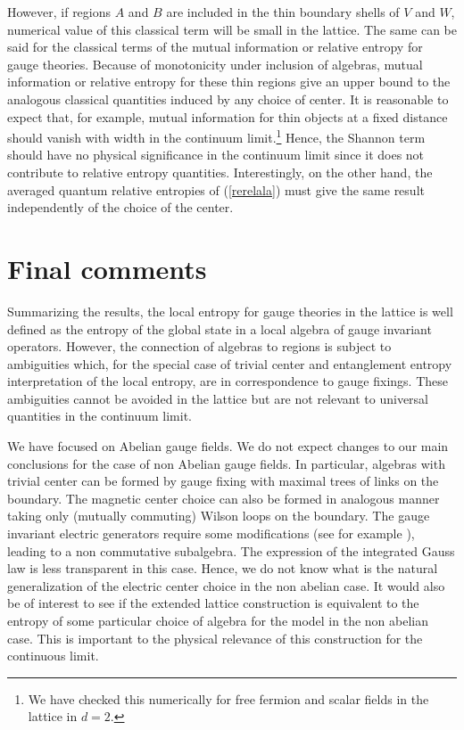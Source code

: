 \documentclass[12pt,a4paper]{article}
\begin{document}
However, if regions $A$ and $B$ are included in the thin boundary shells of $V$ and $W$, numerical value of this classical term will be small 
in the lattice. The same can be said for the classical terms of the mutual information or relative entropy for gauge theories. Because of monotonicity under inclusion of algebras, 
mutual information or relative entropy for these thin regions give an upper bound to the analogous classical quantities induced by any choice of  center. It is reasonable to expect that, for example, mutual information for thin objects at a fixed distance should vanish with width in the continuum limit.\footnote{We have checked this numerically for free fermion and scalar fields in the lattice in $d=2$.} Hence, the Shannon term should have no physical 
significance in the continuum limit since it does not contribute to relative entropy quantities. Interestingly, on the other hand, the averaged quantum relative entropies of (\ref{rerelala}) must give 
the same result independently of the choice of the center.   



\section{Final comments}
Summarizing the results, the local entropy for gauge theories in the lattice is well defined as the entropy of the global state in a 
local algebra of gauge invariant operators. However, the connection of algebras to regions is subject to ambiguities which, for 
the special case of trivial center and entanglement entropy interpretation of the local entropy, are in correspondence to gauge fixings. These 
ambiguities cannot be avoided in the lattice but are not relevant to universal quantities in the continuum limit. 

We have focused on Abelian gauge fields. We do not expect changes to our main conclusions for the case of non Abelian gauge fields. In particular, algebras with trivial center can be formed by gauge fixing with maximal trees of links on the boundary. The magnetic center choice can also be formed in analogous manner taking only (mutually commuting) Wilson loops on the boundary. The gauge invariant electric generators require some modifications (see for example \cite{yaffe}), leading to a non commutative subalgebra. The expression of the integrated Gauss law is less transparent in this case. Hence, we do not know what is the natural generalization of the electric center choice in the non abelian case. It would also be of interest to see if the extended lattice construction is equivalent to the entropy of some particular choice of algebra for the model in the non abelian case. This is important to the physical relevance of this construction for the continuous limit.   
\end{document}
